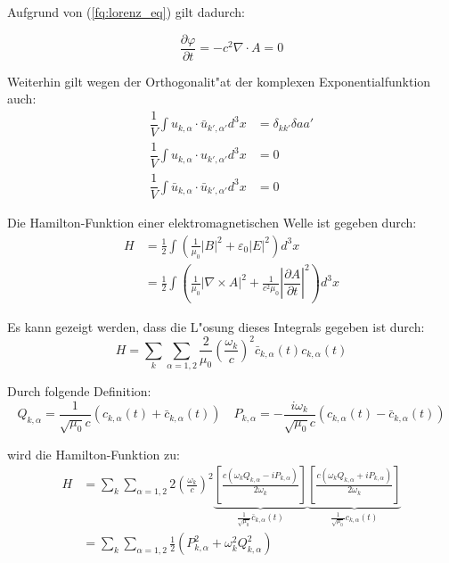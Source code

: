 Aufgrund von (\ref{fq:lorenz_eq}) gilt dadurch:

\begin{equation*}
\frac{\partial \varphi }{\partial t} = - c^2 \nabla \cdot A = 0
\end{equation*}

Weiterhin gilt wegen der Orthogonalit"at der komplexen Exponentialfunktion auch:
\begin{align*}
\dfrac{1}{V} \int u_{k,\alpha} \cdot \bar{u}_{k',\alpha'} d^3 x &= \delta_{kk'}\delta{aa'} \\
\dfrac{1}{V} \int u_{k,\alpha} \cdot u_{k',\alpha'} d^3 x &= 0 \\
\dfrac{1}{V} \int \bar{u}_{k,\alpha} \cdot \bar{u}_{k',\alpha'} d^3 x &= 0
\end{align*}

Die Hamilton-Funktion einer elektromagnetischen Welle ist gegeben durch:
\begin{equation*}
\begin{split}
H &= \frac{1}{2} \int \left(\frac{1}{\mu_0}|B|^2 + \varepsilon_0|E|^2\right) d^3 x \\
	&= \frac{1}{2} \int \left(\frac{1}{\mu_0} | \nabla\times A |^2 + \frac{1}{c^2 \mu_0} \left| \dfrac{\partial A}{\partial t} \right|^2 \right) d^3 x 
\end{split}
\end{equation*}

Es kann gezeigt werden, dass die L"osung dieses Integrals gegeben ist durch:
\begin{equation*}
H = \sum_k \sum_{\alpha=1,2} \frac{2}{\mu_0} \left(\frac{\omega_k}{c}\right)^2 \bar{c}_{k,\alpha}(t) c_{k,\alpha}(t)
\end{equation*}

Durch folgende Definition:
\begin{equation*}
Q_{k,\alpha} = \frac{1}{\sqrt{\mu_0} c}\left(c_{k,\alpha}(t) + \bar{c}_{k,\alpha}(t)\right) \quad P_{k,\alpha} = -\frac{i\omega_k}{\sqrt{\mu_0} c}\left(c_{k,\alpha}(t) - \bar{c}_{k,\alpha}(t)\right) 
\end{equation*}

wird die Hamilton-Funktion zu:
\begin{equation} \label{fq:hamilton}
\begin{split}
H &= \sum_k \sum_{\alpha=1,2} 2 \left(\frac{\omega_k}{c}\right)^2 
	\underbrace{\left[ \frac{c(\omega_k Q_{k,\alpha} - i P_{k,\alpha})}{2 \omega_k} \right]}_{\frac{1}{\sqrt{\mu_0}} \bar{c}_{k,\alpha}(t)}
	\underbrace{\left[ \frac{c(\omega_k Q_{k,\alpha} + i P_{k,\alpha})}{2 \omega_k} \right]}_{\frac{1}{\sqrt{\mu_0}} c_{k,\alpha}(t)} \\
&= \sum_k \sum_{\alpha=1,2} \frac{1}{2} \left(P_{k,\alpha}^2 + \omega_k^2 Q_{k,\alpha}^2\right)
\end{split}
\end{equation}

